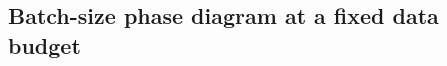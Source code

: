 \documentclass[11pt]{article}
\begin{document}

\subsection{Batch-size phase diagram at a fixed data budget}
\label{app:critical-batch-size}
\end{document}
